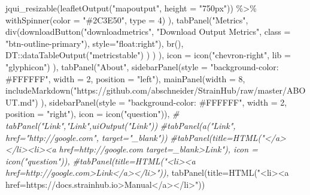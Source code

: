 \documentclass[
]{article}
\newenvironment{Shaded}{\begin{snugshade}}{\end{snugshade}}
\newcommand{\AttributeTok}[1]{\textcolor[rgb]{0.77,0.63,0.00}{#1}}
\newcommand{\CommentTok}[1]{\textcolor[rgb]{0.56,0.35,0.01}{\textit{#1}}}
\newcommand{\DecValTok}[1]{\textcolor[rgb]{0.00,0.00,0.81}{#1}}
\newcommand{\FunctionTok}[1]{\textcolor[rgb]{0.00,0.00,0.00}{#1}}
\newcommand{\NormalTok}[1]{#1}
\newcommand{\SpecialCharTok}[1]{\textcolor[rgb]{0.00,0.00,0.00}{#1}}
\newcommand{\StringTok}[1]{\textcolor[rgb]{0.31,0.60,0.02}{#1}}
\begin{document}
\begin{Shaded}
\begin{Highlighting}[]
                                    \FunctionTok{jqui\_resizable}\NormalTok{(}\FunctionTok{leafletOutput}\NormalTok{(}\StringTok{"mapoutput"}\NormalTok{, }\AttributeTok{height =} \StringTok{"750px"}\NormalTok{)) }\SpecialCharTok{\%\textgreater{}\%} \FunctionTok{withSpinner}\NormalTok{(}\AttributeTok{color =} \StringTok{"\#2C3E50"}\NormalTok{, }\AttributeTok{type =} \DecValTok{4}\NormalTok{)}
\NormalTok{                           ),}
                           \FunctionTok{tabPanel}\NormalTok{(}\StringTok{"Metrics"}\NormalTok{,}
                                    \FunctionTok{div}\NormalTok{(}\FunctionTok{downloadButton}\NormalTok{(}\StringTok{"downloadmetrics"}\NormalTok{, }\StringTok{"Download Output Metrics"}\NormalTok{, }\AttributeTok{class =} \StringTok{"btn{-}outline{-}primary"}\NormalTok{), }\AttributeTok{style=}\StringTok{"float:right"}\NormalTok{),}
                                    \FunctionTok{br}\NormalTok{(),}
\NormalTok{                                    DT}\SpecialCharTok{::}\FunctionTok{dataTableOutput}\NormalTok{(}\StringTok{"metricstable"}\NormalTok{)}
\NormalTok{                           )}
\NormalTok{               )}
\NormalTok{             ),}
             \AttributeTok{icon =} \FunctionTok{icon}\NormalTok{(}\StringTok{"chevron{-}right"}\NormalTok{, }\AttributeTok{lib =} \StringTok{"glyphicon"}\NormalTok{)}
\NormalTok{    ),}
    \FunctionTok{tabPanel}\NormalTok{(}\StringTok{"About"}\NormalTok{,}
             \FunctionTok{sidebarPanel}\NormalTok{(}\AttributeTok{style =} \StringTok{"background{-}color: \#FFFFFF"}\NormalTok{, }\AttributeTok{width =} \DecValTok{2}\NormalTok{, }\AttributeTok{position =} \StringTok{"left"}\NormalTok{),}
             \FunctionTok{mainPanel}\NormalTok{(}\AttributeTok{width =} \DecValTok{8}\NormalTok{,}
                       \FunctionTok{includeMarkdown}\NormalTok{(}\StringTok{"https://github.com/abschneider/StrainHub/raw/master/ABOUT.md"}\NormalTok{)}
\NormalTok{                       ),}
             \FunctionTok{sidebarPanel}\NormalTok{(}\AttributeTok{style =} \StringTok{"background{-}color: \#FFFFFF"}\NormalTok{, }\AttributeTok{width =} \DecValTok{2}\NormalTok{, }\AttributeTok{position =} \StringTok{"right"}\NormalTok{),}
             \AttributeTok{icon =} \FunctionTok{icon}\NormalTok{(}\StringTok{"question"}\NormalTok{)),}
   \CommentTok{\# tabPanel("Link","Link",uiOutput("Link"))}
   \CommentTok{\#tabPanel(a("Link", href="http://google.com", target="\_blank"))}
   \CommentTok{\#tabPanel(title=HTML("\textless{}/a\textgreater{}\textless{}/li\textgreater{}\textless{}li\textgreater{}\textless{}a href=\textquotesingle{}http://google.com\textquotesingle{} target=\textquotesingle{}\_blank\textquotesingle{}\textgreater{}Link"), icon = icon("question")),}
   \CommentTok{\#tabPanel(title=HTML("\textless{}li\textgreater{}\textless{}a href=\textquotesingle{}http://google.com\textquotesingle{}\textgreater{}Link\textless{}/a\textgreater{}\textless{}/li\textgreater{}")),}
   \FunctionTok{tabPanel}\NormalTok{(}\AttributeTok{title=}\FunctionTok{HTML}\NormalTok{(}\StringTok{"\textless{}li\textgreater{}\textless{}a href=\textquotesingle{}https://docs.strainhub.io\textquotesingle{}\textgreater{}Manual\textless{}/a\textgreater{}\textless{}/li\textgreater{}"}\NormalTok{))}
   

\end{Highlighting}
\end{Shaded}
\end{document}

